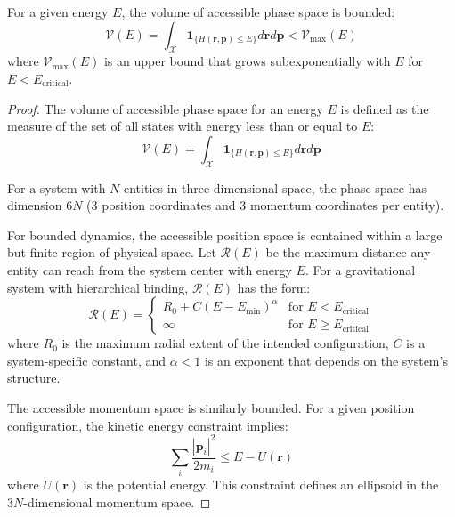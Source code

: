 \begin{theorem}
For a given energy $E$, the volume of accessible phase space is bounded:
\begin{equation}
\mathcal{V}(E) = \int_{\mathcal{X}} \mathbf{1}_{\{H(\mathbf{r}, \mathbf{p}) \leq E\}} d\mathbf{r} d\mathbf{p} < \mathcal{V}_{\text{max}}(E)
\end{equation}
where $\mathcal{V}_{\text{max}}(E)$ is an upper bound that grows subexponentially with $E$ for $E < E_{\text{critical}}$.
\end{theorem}

\begin{proof}
The volume of accessible phase space for an energy $E$ is defined as the measure of the set of all states with energy less than or equal to $E$:
\begin{equation}
\mathcal{V}(E) = \int_{\mathcal{X}} \mathbf{1}_{\{H(\mathbf{r}, \mathbf{p}) \leq E\}} d\mathbf{r} d\mathbf{p}
\end{equation}

For a system with $N$ entities in three-dimensional space, the phase space has dimension $6N$ (3 position coordinates and 3 momentum coordinates per entity).

For bounded dynamics, the accessible position space is contained within a large but finite region of physical space. Let $\mathcal{R}(E)$ be the maximum distance any entity can reach from the system center with energy $E$. For a gravitational system with hierarchical binding, $\mathcal{R}(E)$ has the form:
\begin{equation}
\mathcal{R}(E) = \begin{cases}
R_0 + C(E - E_{\text{min}})^{\alpha} & \text{for } E < E_{\text{critical}} \\
\infty & \text{for } E \geq E_{\text{critical}}
\end{cases}
\end{equation}
where $R_0$ is the maximum radial extent of the intended configuration, $C$ is a system-specific constant, and $\alpha < 1$ is an exponent that depends on the system's structure.

The accessible momentum space is similarly bounded. For a given position configuration, the kinetic energy constraint implies:
\begin{equation}
\sum_i \frac{|\mathbf{p}_i|^2}{2m_i} \leq E - U(\mathbf{r})
\end{equation}
where $U(\mathbf{r})$ is the potential energy. This constraint defines an ellipsoid in the $3N$-dimensional momentum space.


\end{proof}
